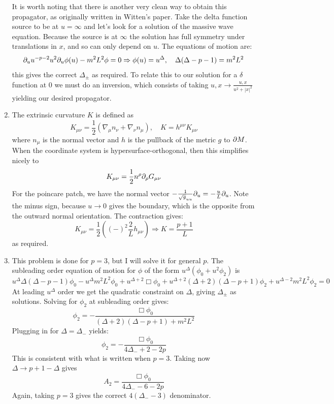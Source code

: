 \documentclass[11pt, class=article, crop=false]{standalone}
\begin{document}
\begin{enumerate}
	It is worth noting that there is another very clean way to obtain this propagator, as originally written in Witten's paper. Take the delta function source to be at $u = \infty$ and let's look for a solution of the massive wave equation. Because the source is at $\infty$ the solution has full symmetry under translations in $x$, and so can only depend on $u$. The equations of motion are:
	\[
		\partial_u u^{-p - 2} u^{2} \partial_u \phi(u) - m^2 L^2 \phi = 0 \Rightarrow \phi(u) = u^\Delta, \quad \Delta (\Delta - p - 1) = m^2 L^2
	\]
	this gives the correct $\Delta_{\pm}$ as required. To relate this to our solution for a $\delta$ function at $0$ we must do an inversion, which consists of taking $u, x \to \frac{u, x}{u^2 + |x|^2}$ yielding our desired propagator. 
	
	\item The extrinsic curvature $K$ is defined as
	\[
		K_{\mu \nu} = \frac12 (\nabla_\mu n_\nu + \nabla_\nu n_\mu), \quad K = h^{\mu \nu} K_{\mu \nu}
	\]
	where $n_\mu$ is the normal vector and $h$ is the pullback of the metric $g$ to $\partial M$. When the coordinate system is hypersurface-orthogonal, then this simplifies nicely to 
	\[
		K_{\mu \nu} = \frac12 n^\rho \partial_\rho G_{\mu \nu}
	\]
	For the poincare patch, we have the normal vector $-\frac{1}{\sqrt g_{uu} }\partial_u = -\frac{u}{L} \partial_u$. Note the minus sign, because $u \to 0$ gives the boundary, which is the opposite from the outward normal orientation. The contraction gives:
	\[
		K_{\mu \nu} = \frac12 ((-)^2 \frac{2}{L} h_{\mu \nu}) \Rightarrow K = \frac{p+1}{L}
	\]
	as required.
	
	\item This problem is done for $p=3$, but I will solve it for general $p$. The subleading order equation of motion for $\phi$ of the form $u^{\Delta} (\phi_0 + u^2 \phi_2)$ is
	\[
		u^\Delta \Delta (\Delta -p-1) \phi_0 -  u^{\Delta} m^2 L^2 \phi_0 + u^{\Delta + 2} \Box \phi_0  + u^{\Delta + 2} (\Delta+2) (\Delta - p + 1)  \phi_2 + u^{\Delta - 2} m^2 L^2 \phi_2 = 0
	\]
	At leading $u^{\Delta}$ order we get the quadratic constraint on $\Delta$, giving $\Delta_\pm$ as solutions. Solving for $\phi_2$ at subleading order gives:
	\[
		\phi_2 = - \frac{\Box \phi_0}{(\Delta+2)(\Delta-p+1) + m^2 L^2}
	\]
	Plugging in for $\Delta = \Delta_-$ yields:
	\[
		\phi_2 = - \frac{\Box \phi_0}{4 \Delta_- + 2 - 2p}
	\]
	This is consistent with what is written when $p=3$. Taking now $\Delta \to p+1 - \Delta$ gives
	\[
		A_2 = \frac{\Box \phi_0}{4 \Delta_- - 6 - 2 p}
	\]
	Again, taking $p = 3$ gives the correct $4 (\Delta_- - 3)$ denominator.
	

\end{enumerate}
\end{document}
